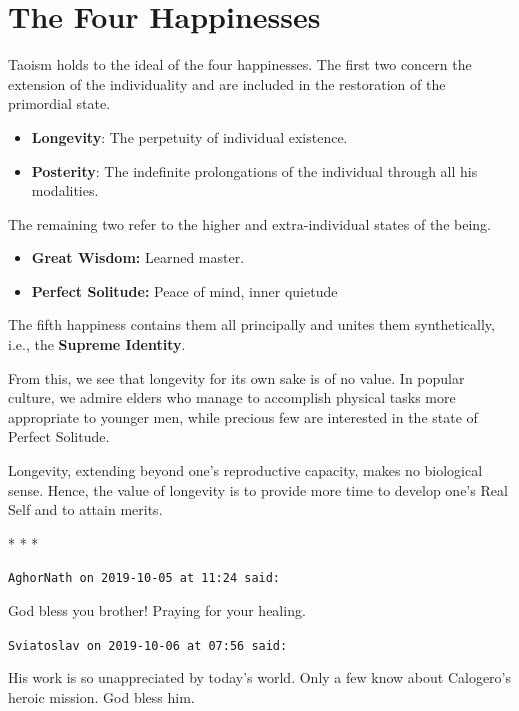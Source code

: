 \section{The Four Happinesses}

Taoism holds to the ideal of the four happinesses. The first two concern the extension of the individuality and are included in the restoration of the primordial state.

\begin{itemize}

\item \textbf{Longevity}: The perpetuity of individual existence.

\item \textbf{Posterity}: The indefinite prolongations of the individual through all his modalities.
\end{itemize}


The remaining two refer to the higher and extra-individual states of the being.

\begin{itemize}
\item \textbf{Great Wisdom:} Learned master.

\item \textbf{Perfect Solitude:} Peace of mind, inner quietude
\end{itemize}

The fifth happiness contains them all principally and unites them synthetically, i.e., the \textbf{Supreme Identity}.

From this, we see that longevity for its own sake is of no value. In popular culture, we admire elders who manage to accomplish physical tasks more appropriate to younger men, while precious few are interested in the state of Perfect Solitude.

Longevity, extending beyond one's reproductive capacity, makes no biological sense. Hence, the value of longevity is to provide more time to develop one's Real Self and to attain merits.



\begin{center}* * *\end{center}

\begin{footnotesize}
\begin{sffamily}
\texttt{AghorNath on 2019-10-05 at 11:24 said:}

God bless you brother! Praying for your healing.

\hfill

\texttt{Sviatoslav on 2019-10-06 at 07:56 said:}

His work is so unappreciated by today's world. Only a few know about Calogero's heroic mission. God bless him.


\hfill

\end{sffamily}
\end{footnotesize}

